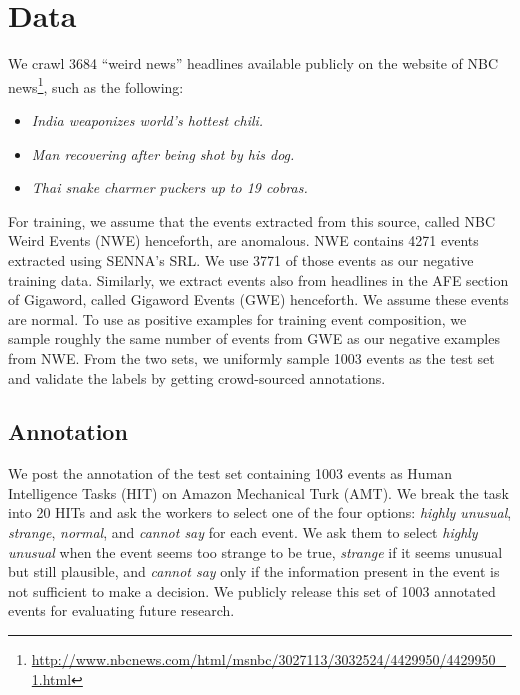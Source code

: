 \section{Data}
We crawl 3684 ``weird news'' headlines available publicly 
on the website of NBC
news\footnote{\url{
http://www.nbcnews.com/html/msnbc/3027113/3032524/4429950/4429950_1.html}}, 
such as the following: 
\begin{itemize}
 \item[] \textit{India weaponizes world's hottest chili.}
 \item[] \textit{Man recovering after being shot by his dog.}
 \item[] \textit{Thai snake charmer puckers up to 19 cobras.}
\end{itemize}
For training, we assume that the events extracted from this source, called NBC Weird Events
(NWE) henceforth, are anomalous.  NWE contains 4271 events extracted using 
SENNA's \citep{collobert2011natural} SRL.  We use 3771 of those events as our negative training data. 
Similarly, we extract events also from
headlines in the AFE section of Gigaword, called Gigaword Events (GWE)
henceforth.  We assume these events are normal.
To use as positive examples for training event composition, we sample roughly
the same number of events from 
GWE as our negative examples from NWE. From the two sets, we uniformly sample 
1003 events
as the test set and validate the labels by getting crowd-sourced annotations.

\subsection{Annotation}
\label{sec:nem_annot}
We post the annotation of the test set containing 1003 events as
Human Intelligence Tasks (HIT) on Amazon Mechanical Turk (AMT).
We break the task into 20 HITs and ask the workers to select one of the 
four options: \textit{highly unusual}, \textit{strange}, \textit{normal}, and 
\textit{cannot say} for each event.  We ask them to select \textit{highly
unusual} when the 
event seems too strange to be true, \textit{strange} if it seems unusual but 
still plausible, and \textit{cannot say} only if the information present in the 
event is not sufficient to make a decision.  We publicly release this set of 
1003
annotated events for evaluating future research.

